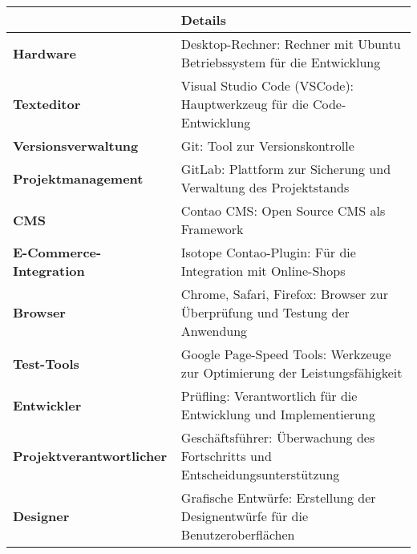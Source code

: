 \begin{tabular}{|l|p{10cm}|}
\hline
\rowcolor{heading}{\textbf{Kategorie}} & {\textbf{Details}} \\ \hline
\textbf{Hardware} & Desktop-Rechner: Rechner mit Ubuntu Betriebssystem für die Entwicklung \\ \hline
\textbf{Texteditor} & Visual Studio Code (VSCode): Hauptwerkzeug für die Code-Entwicklung \\ \hline
\textbf{Versionsverwaltung} & Git: Tool zur Versionskontrolle \\ \hline
\textbf{Projektmanagement} & GitLab: Plattform zur Sicherung und Verwaltung des Projektstands \\ \hline
\textbf{CMS} & Contao CMS: Open Source CMS als Framework \\ \hline
\textbf{E-Commerce-Integration} & Isotope Contao-Plugin: Für die Integration mit Online-Shops \\ \hline
\textbf{Browser} & Chrome, Safari, Firefox: Browser zur Überprüfung und Testung der Anwendung \\ \hline
\textbf{Test-Tools} & Google Page-Speed Tools: Werkzeuge zur Optimierung der Leistungsfähigkeit \\ \hline
\textbf{Entwickler} & Prüfling: Verantwortlich für die Entwicklung und Implementierung \\ \hline
\textbf{Projektverantwortlicher} & Geschäftsführer: Überwachung des Fortschritts und Entscheidungsunterstützung \\ \hline
\textbf{Designer} & Grafische Entwürfe: Erstellung der Designentwürfe für die Benutzeroberflächen \\ \hline
\end{tabular}
